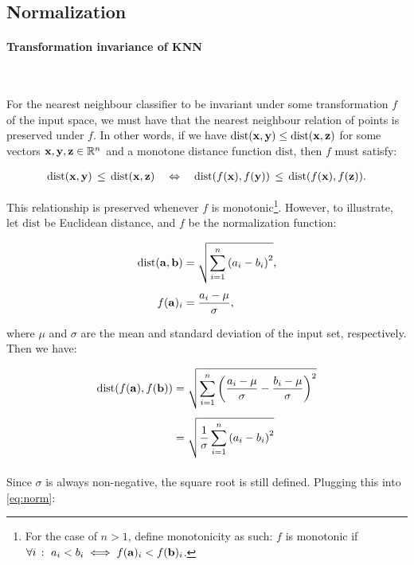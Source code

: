 \subsection{Normalization}

\paragraph{Transformation invariance of KNN}~\smallskip

For the nearest neighbour classifier to be invariant under some transformation
$f$ of the input space, we must have that the nearest neighbour relation of points
is preserved under $f$. In other words, if we have $\text{dist}(\mathbf{x}, \mathbf{y})
\leq \text{dist}(\mathbf{x}, \mathbf{z})$ for some vectors $\mathbf{x}, \mathbf{y}, \mathbf{z} \in
\mathbb R^n$ and a monotone distance function $\text{dist}$, then
$f$ must satisfy:

\begin{align*}
  \text{dist}(\mathbf{x}, \mathbf{y}) \, \leq \, \text{dist}(\mathbf{x}, \mathbf{z})\quad
  \Leftrightarrow \quad
  \text{dist}(f(\mathbf{x}), f(\mathbf{y})) \, \leq\, \text{dist}(f(\mathbf{x}), f(\mathbf{z})).
\end{align*}

This relationship is preserved whenever $f$ is monotonic\footnote{For the case
of $n > 1$, define monotonicity as such: $f$ is monotonic if $\forall i\,:\ a_i < b_i \iff
f(\mathbf{a})_i < f(\mathbf{b})_i$.}. However, to
illustrate, let $\text{dist}$ be Euclidean distance, and $f$ be the
normalization function:

\begin{align*}
  \text{dist}(\mathbf{a}, \mathbf{b}) &= \sqrt{\sum_{i = 1}^n \left(a_i - b_i\right)^2}, \\[4pt]
  f(\mathbf{a})_i &= \frac{a_i - \mu}{\sigma},
\end{align*}

where $\mu$ and $\sigma$ are the mean and standard deviation of the input set,
respectively. Then we have:

\begin{align*}
  \text{dist}(f(\mathbf{a}), f(\mathbf{b})) &= \sqrt{\sum_{i = 1}^n \left(\frac{a_i -
  \mu}{\sigma}- \frac{b_i - \mu}{\sigma}\right)^2}\\[4pt]
  &= \sqrt{\frac{1}{\sigma}\sum_{i = 1}^n \left(a_i - b_i\right)^2}\\[4pt]
\end{align*}

Since $\sigma$ is always non-negative, the square root is still defined.
Plugging this into \cref{eq:norm}:

